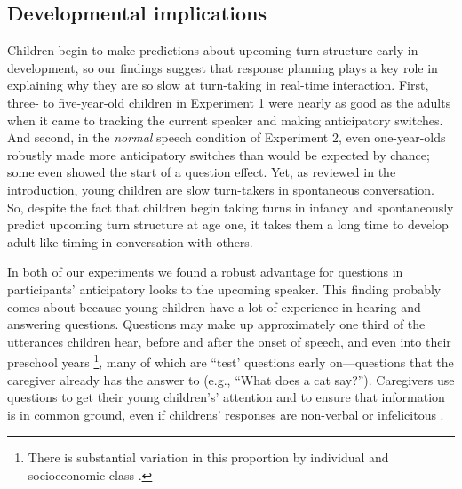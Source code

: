 \documentclass[authoryear, 12pt]{elsarticle}
\begin{document}
\subsection{Developmental implications}

Children begin to make predictions about upcoming turn structure early in development, so our findings suggest that response planning plays a key role in explaining why they are so slow at turn-taking in real-time interaction. First, three- to five-year-old children in Experiment 1 were nearly as good as the adults when it came to tracking the current speaker and making anticipatory switches. And second, in the \textit{normal} speech condition of Experiment 2, even one-year-olds robustly made more anticipatory switches than would be expected by chance; some even showed the start of a question effect. Yet, as reviewed in the introduction, young children are slow turn-takers in spontaneous conversation. So, despite the fact that children begin taking turns in infancy and spontaneously predict upcoming turn structure at age one, it takes them a long time to develop adult-like timing in conversation with others. 

In both of our experiments we found a robust advantage for questions in participants' anticipatory looks to the upcoming speaker. This finding probably comes about because young children have a lot of experience in hearing and answering questions. Questions may make up approximately one third of the utterances children hear, before and after the onset of speech, and even into their preschool years \citep{fitneva2012, henning2005, shatz1979}\footnote{There is substantial variation in this proportion by individual and socioeconomic class \citep{hart1992}.}, many of which are ``test' questions early on---questions that the caregiver already has the answer to (e.g., ``What does a cat say?''). Caregivers use questions to get their young children's' attention and to ensure that information is in common ground, even if childrens' responses are non-verbal or infelicitous \citep{fitneva2012, snow1977}. 

\end{document}
